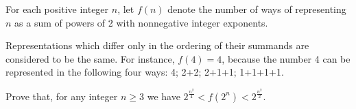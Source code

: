 For each positive integer $ n$,  let $ f(n)$ denote the number of ways of representing $ n$
 as a sum of powers of 2 with nonnegative integer exponents. 

Representations which differ only in the ordering of their summands are 
considered to be the same.
For instance, $ f(4) = 4$,  because the number 4 can be represented in the following four ways: 4; 2+2; 2+1+1; 1+1+1+1.

Prove that, for any integer $ n \geq 3$ we have $ 2^{\frac {n^2}{4}} < f(2^n) < 2^{\frac {n^2}2}$.
